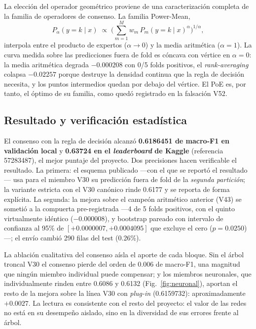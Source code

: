 \documentclass[journal]{IEEEtai}
\begin{document}
La elecci\'on del operador geom\'etrico proviene de una caracterizaci\'on completa de la familia de operadores de consenso. La familia Power-Mean,
\begin{equation}
P_\alpha(y = k \mid x) \;\propto\; \Big( \sum_{m=1}^{M} w_m \, P_m(y = k \mid x)^{\alpha} \Big)^{1/\alpha},
\label{eq:powermean}
\end{equation}
interpola entre el producto de expertos ($\alpha \to 0$) y la media aritm\'etica ($\alpha = 1$). La curva medida sobre las predicciones fuera de fold es c\'oncava con v\'ertice en $\alpha = 0$: la media aritm\'etica degrada $-0.000208$ con 0/5 folds positivos, el \textit{rank-averaging} colapsa $-0.02257$ porque destruye la densidad continua que la regla de decisi\'on necesita, y los puntos intermedios quedan por debajo del v\'ertice. El PoE es, por tanto, el \'optimo de su familia, como qued\'o registrado en la falsaci\'on V52.

\subsection{Resultado y verificaci\'on estad\'istica}

El consenso con la regla de decisi\'on alcanz\'o \textbf{0.6186451 de macro-F1 en validaci\'on local} y \textbf{0.63724 en el \textit{leaderboard} de Kaggle} (referencia 57283487), el mejor puntaje del proyecto. Dos precisiones hacen verificable el resultado. La primera: el esquema publicado ---con el que se report\'o el resultado--- usa para el miembro V30 su predicci\'on fuera de fold de la \emph{segunda partici\'on}; la variante estricta con el V30 can\'onico rinde 0.6177 y se reporta de forma expl\'icita. La segunda: la mejora sobre el campe\'on aritm\'etico anterior (V43) se someti\'o a la compuerta pre-registrada ---4 de 5 folds positivos, con el quinto virtualmente id\'entico ($-0.000008$), y bootstrap pareado con intervalo de confianza al 95\% de $[+0.0000007, +0.0004095]$ que excluye el cero ($p = 0.0250$)---; el env\'io cambi\'o 290 filas del test (0.26\%).

La ablaci\'on cualitativa del consenso a\'isla el aporte de cada bloque. Sin el \'arbol troncal V30 el consenso pierde del orden de 0.006 de macro-F1, una magnitud que ning\'un miembro individual puede compensar; y los miembros neuronales, que individualmente rinden entre 0.6086 y 0.6132 (Fig.~\ref{fig:neuronal}), aportan el resto de la mejora sobre la l\'inea V30 con \textit{plug-in} (0.6159732): aproximadamente $+0.0027$. La lectura es consistente con el resto del proyecto: el valor de las redes no est\'a en su desempe\~no aislado, sino en la diversidad de sus errores frente al \'arbol.
\end{document}
